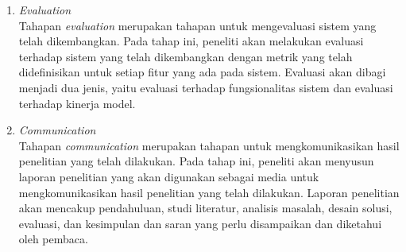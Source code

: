 \begin{enumerate}
	\item \emph{Evaluation}~\\
	      Tahapan \emph{evaluation} merupakan tahapan untuk mengevaluasi sistem yang telah dikembangkan. Pada tahap ini, peneliti akan melakukan evaluasi terhadap sistem yang telah dikembangkan dengan metrik yang telah didefinisikan untuk setiap fitur yang ada pada sistem. Evaluasi akan dibagi menjadi dua jenis, yaitu evaluasi terhadap fungsionalitas sistem dan evaluasi terhadap kinerja model.
\item \emph{Communication}~\\
	      Tahapan \emph{communication} merupakan tahapan untuk mengkomunikasikan hasil penelitian yang telah dilakukan. Pada tahap ini, peneliti akan menyusun laporan penelitian yang akan digunakan sebagai media untuk mengkomunikasikan hasil penelitian yang telah dilakukan. Laporan penelitian akan mencakup pendahuluan, studi literatur, analisis masalah, desain solusi, evaluasi, dan kesimpulan dan saran yang perlu disampaikan dan diketahui oleh pembaca.
\end{enumerate}
